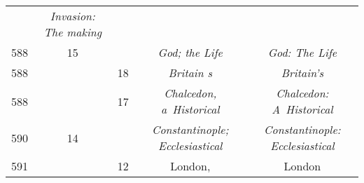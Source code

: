 \documentclass[a4paper,11pt]{article}
\begin{document}
\begin{center}
\begin{tabular}{|c|c|c|c|c|}
           & \textit{Invasion: The making} \\
    588 & 15 & & \textit{God; the Life} & \textit{God: The Life} \\
    588 & & 18 & \textit{Britain s} & \textit{Britain's} \\
    588 & & 17 & \textit{Chalcedon, a~Historical}
           & \textit{Chalcedon: A~Historical} \\
    590 & 14 & & \textit{Constantinople; Ecclesiastical}
           & \textit{Constantinople: Ecclesiastical} \\
    591 & & 12 & London, & London \\
    \hline
  \end{tabular}





  \newpage


\end{center}
\end{document}
